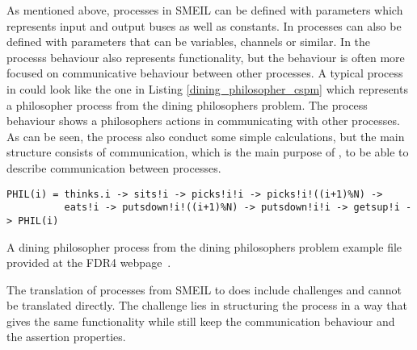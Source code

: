 

As mentioned above, processes in SMEIL can be defined with parameters which represents input and output buses as well as constants. In \cspm{} processes can also be defined with parameters that can be variables, channels or similar.
In \cspm the processs behaviour also represents functionality, but the behaviour is often more focused on communicative behaviour between other processes. A typical process in \cspm could look like the one in Listing \ref{dining_philosopher_cspm} which represents a philosopher process from the dining philosophers problem. The process behaviour shows a philosophers actions in communicating with other processes. As can be seen, the process also conduct some simple calculations, but the main structure consists of communication, which is the main purpose of \cspm, to be able to describe communication between processes.
\begin{listing}
\begin{verbatim}
PHIL(i) = thinks.i -> sits!i -> picks!i!i -> picks!i!((i+1)%N) ->
          eats!i -> putsdown!i!((i+1)%N) -> putsdown!i!i -> getsup!i -> PHIL(i)

\end{verbatim}
\caption{A dining philosopher process from the dining philosophers problem example file provided at the FDR4 webpage~\cite{fdr_example}.}
\label{dining_philosopher_cspm}
\end{listing}

The translation of processes from SMEIL to \cspm does include challenges and cannot be translated directly. The challenge lies in structuring the \cspm process in a way that gives the same functionality while still keep the \cspm communication behaviour and the assertion properties.

